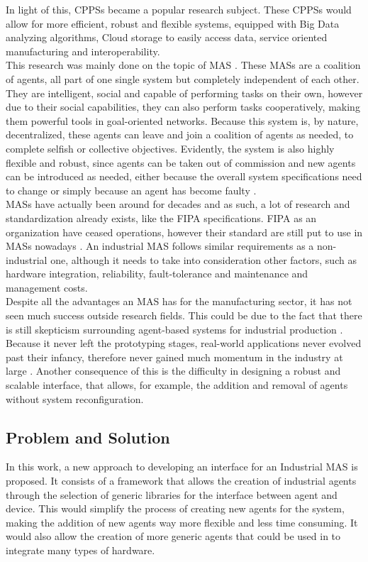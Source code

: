 In light of this, \gls{CPPS}s became a popular research subject. These \gls{CPPS}s would allow for more efficient, robust and flexible systems, equipped with Big Data analyzing algorithms, Cloud storage to easily access data, service oriented manufacturing and interoperability.\\

This research was mainly done on the topic of \gls{MAS} \cite{sakurada01} \cite{karnouskos01}. These \gls{MAS}s are a coalition of agents, all part of one single system but completely independent of each other. They are intelligent, social and capable of performing tasks on their own, however due to their social capabilities, they can also perform tasks cooperatively, making them powerful tools in goal-oriented networks. Because this system is, by nature, decentralized, these agents can leave and join a coalition of agents as needed, to complete selfish or collective objectives. Evidently, the system is also highly flexible and robust, since agents can be taken out of commission and new agents can be introduced as needed, either because the overall system specifications need to change or simply because an agent has become faulty \cite{paulo02}. \\

\gls{MAS}s have actually been around for decades and as such, a lot of research and standardization already exists, like the \gls{FIPA} specifications. \gls{FIPA} as an organization have ceased operations, however their standard are still put to use in \gls{MAS}s nowadays \cite{FIPA_website}. An industrial \gls{MAS} follows similar requirements as a non-industrial one, although it needs to take into consideration other factors, such as hardware integration, reliability, fault-tolerance and maintenance and management costs.\\

Despite all the advantages an \gls{MAS} has for the manufacturing sector, it has not seen much success outside research fields. This could be due to the fact that there is still skepticism surrounding agent-based systems for industrial production \cite{bottling_plant_part2}. Because it never left the prototyping stages, real-world applications never evolved past their infancy, therefore never gained much momentum in the industry at large \cite{karnouskos02}. Another consequence of this is the difficulty in designing a robust and scalable interface, that allows, for example, the addition and removal of agents without system reconfiguration. 

\subsection{Problem and Solution}

In this work, a new approach to developing an interface for an Industrial \gls{MAS} is proposed. It consists of a framework that allows the creation of industrial agents through the selection of generic libraries for the interface between agent and device. This would simplify the process of creating new agents for the system, making the addition of new agents way more flexible and less time consuming. It would also allow the creation of more generic agents that could be used in to integrate many types of hardware.